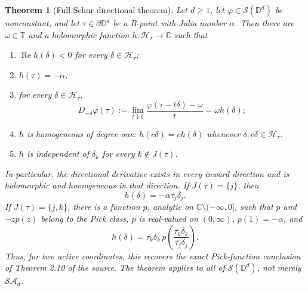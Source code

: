 \documentclass[11pt]{article}
\newtheorem{theorem}{Theorem}
\theoremstyle{definition}
\theoremstyle{remark}
\newcommand{\D}{\mathbb D}
\newcommand{\T}{\mathbb T}
\newcommand{\C}{\mathbb C}
\newcommand{\SA}{\mathcal{SA}}
\newcommand{\Schur}{\mathcal S}
\newcommand{\re}{\operatorname{Re}}
\begin{document}
\begin{theorem}[Full-Schur directional theorem]
\label{thm:directional}
Let \(d\ge1\), let \(\varphi\in\Schur(\D^d)\) be nonconstant, and let \(\tau\in\partial\D^d\) be a B-point with Julia number \(\alpha\).  Then there are \(\omega\in\T\) and a holomorphic function \(h:\mathcal H_\tau\to\C\) such that
\begin{enumerate}[label=(\roman*)]
\item \(\re h(\delta)<0\) for every \(\delta\in\mathcal H_\tau\);
\item \(h(\tau)=-\alpha\);
\item for every \(\delta\in\mathcal H_\tau\),
\[
 D_{-\delta}\varphi(\tau)
 :=\lim_{t\downarrow0}\frac{\varphi(\tau-t\delta)-\omega}{t}
 =\omega h(\delta);
\]
\item \(h\) is homogeneous of degree one: \(h(c\delta)=c h(\delta)\) whenever \(\delta,c\delta\in\mathcal H_\tau\).
\item \(h\) is independent of \(\delta_k\) for every \(k\notin J(\tau)\).
\end{enumerate}
In particular, the directional derivative exists in every inward direction and is holomorphic and homogeneous in that direction.  If \(J(\tau)=\{j\}\), then
\[
 h(\delta)=-\alpha\overline{\tau_j}\delta_j.
\]
If \(J(\tau)=\{j,k\}\), there is a function \(p\), analytic on \(\C\setminus(-\infty,0]\), such that \(p\) and \(-zp(z)\) belong to the Pick class, \(p\) is real-valued on \((0,\infty)\), \(p(1)=-\alpha\), and
\begin{equation}
 h(\delta)=\overline{\tau_k}\delta_k\,
 p\!\left(\frac{\overline{\tau_k}\delta_k}
 {\overline{\tau_j}\delta_j}\right).
 \label{eq:pickform}
\end{equation}
Thus, for two active coordinates, this recovers the exact Pick-function conclusion of Theorem 2.10 of the source.  The theorem applies to all of \(\Schur(\D^d)\), not merely \(\SA_d\).
\end{theorem}
\end{document}
